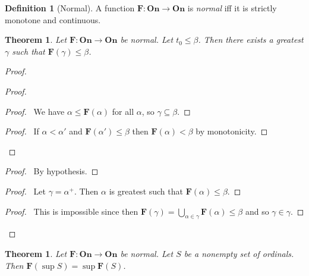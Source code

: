 \documentclass{article}
\let\qed\relax
\newtheorem{theorem}[axiom]{Theorem}
\theoremstyle{definition}
\newtheorem{definition}[axiom]{Definition}
\begin{document}
    \begin{definition}[Normal]
        A function $\mathbf{F} : \mathbf{On} \rightarrow \mathbf{On}$ is \emph{normal} iff it is
        strictly monotone and continuous.
    \end{definition}

    \begin{theorem}
        Let $\mathbf{F} : \mathbf{On} \rightarrow \mathbf{On}$ be normal. Let $t_0 \leq \beta$.
        Then there exists a greatest $\gamma$ such that $\mathbf{F}(\gamma) \leq \beta$.
    \end{theorem}

    \begin{proof}
        \pf
            \begin{proof}
                \begin{proof}
                    \pf\ We have $\alpha \leq \mathbf{F}(\alpha)$ for all $\alpha$, so $\gamma \subseteq \beta$.
                \end{proof}
                \begin{proof}
                    \pf\ If $\alpha < \alpha'$ and $\mathbf{F}(\alpha') \leq \beta$ then $\mathbf{F}(\alpha) < \beta$
                    by monotonicity.
                \end{proof}
            \end{proof}
            \begin{proof}
                \pf\ By hypothesis.
            \end{proof}
        \begin{proof}
            \pf\ Let $\gamma = \alpha^+$. Then $\alpha$ is greatest such that $\mathbf{F}(\alpha) \leq \beta$.
        \end{proof}
        \begin{proof}
            \pf\ This is impossible since then $\mathbf{F}(\gamma) = \bigcup_{\alpha \in \gamma} \mathbf{F}(\alpha) \leq \beta$
            and so $\gamma \in \gamma$.
        \end{proof}
        \qed
    \end{proof}

    \begin{theorem}
        \label{theorem:normal_sup}
        Let $\mathbf{F} : \mathbf{On} \rightarrow \mathbf{On}$ be normal. Let $S$ be a nonempty set of
        ordinals. Then $\mathbf{F}(\sup S) = \sup \mathbf{F}(S)$.
    \end{theorem}
\end{document}
